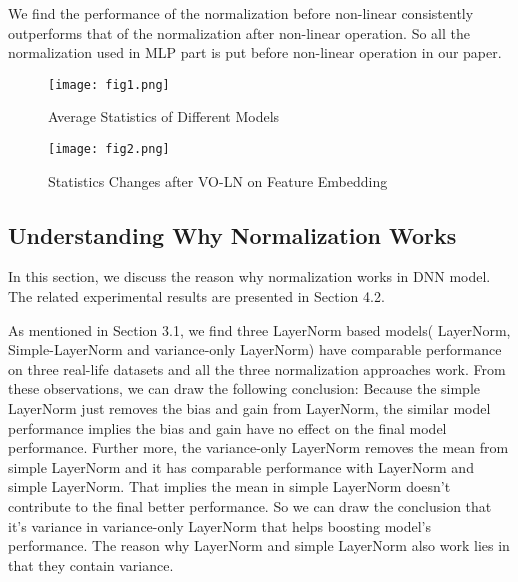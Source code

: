 \documentclass[sigconf]{acmart}
\begin{document}
We find the performance of the normalization before non-linear consistently outperforms that of the normalization after non-linear operation. So all the normalization used in MLP part is put before non-linear operation in our paper.

\begin{figure}[!]
  \texttt{[image: fig1.png]}
  \caption{Average Statistics of Different Models}
  \label{fig:fig1}
\end{figure}

\begin{figure}[!]
  \texttt{[image: fig2.png]}
  \caption{Statistics Changes after VO-LN on Feature Embedding}
  \label{fig:fig2}
\end{figure}



\subsection{Understanding Why Normalization Works}
In this section, we discuss the reason why normalization works in DNN model. The related experimental results are presented in Section 4.2.


As mentioned in Section 3.1, we find three LayerNorm based models( LayerNorm, Simple-LayerNorm and variance-only LayerNorm) have comparable performance on three real-life datasets and all the three normalization approaches work. From these observations, we can draw the following conclusion: Because the simple LayerNorm just removes the bias and gain from LayerNorm, the similar model performance implies the bias and gain have no effect on the final model performance. Further more, the variance-only LayerNorm removes the mean from simple LayerNorm and it has comparable performance with LayerNorm and simple LayerNorm. That implies the mean in simple LayerNorm doesn't contribute to the final better performance. So we can draw the conclusion that it's variance in variance-only LayerNorm that helps boosting model's performance.  The reason why LayerNorm and simple LayerNorm also work lies in that they contain variance.
\end{document}
